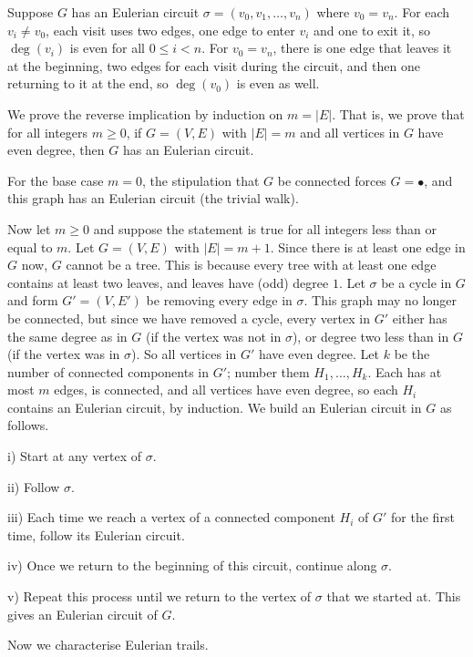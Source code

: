 \proof Suppose $G$ has an Eulerian circuit $\sigma = (v_0, v_1, \ldots, v_n)$ where
$v_0 = v_n$. For each $v_i\ne v_0$, each visit uses two edges, one edge to enter $v_i$ and
one to exit it, so $\deg(v_i)$ is even for all $0\le i < n$. For $v_0 = v_n$, there is one
edge that leaves it at the beginning, two edges for each visit during the circuit, and then
one returning to it at the end, so $\deg(v_0)$ is even as well.

We prove the reverse implication by induction on $m = |E|$. That is, we prove
that for all integers $m\ge 0$, if $G = (V,E)$ with $|E| = m$ and all vertices in $G$ have
even degree, then $G$ has an Eulerian circuit.

For the base case $m=0$, the stipulation
that $G$ be connected forces
$G = \bullet$, and this graph has an Eulerian circuit (the trivial walk).

Now let $m\ge 0$ and suppose the statement is true for all integers less than or equal to $m$.
Let $G = (V,E)$ with $|E| = m+1$. Since there is at least one edge in $G$ now, $G$ cannot be
a tree. This is because every tree with at least one edge contains at least two leaves,
and leaves have (odd) degree $1$. Let $\sigma$ be a cycle in $G$ and form $G' = (V,E')$
be removing every edge in $\sigma$. This graph may no longer be connected, but since we have removed
a cycle, every vertex in $G'$ either has the same degree as in $G$ (if the vertex
was not in $\sigma$), or degree two less than in $G$ (if the vertex was in $\sigma$). So all
vertices in $G'$ have even degree. Let $k$ be the number of connected components in
$G'$; number them $H_1,\ldots,H_k$. Each has at most $m$ edges, is connected, and all vertices
have even degree, so each $H_i$ contains an Eulerian circuit, by induction. We build an Eulerian
circuit in $G$ as follows.
\medskip
\item{i)} Start at any vertex of $\sigma$.
\smallskip
\item{ii)} Follow $\sigma$.
\smallskip
\item{iii)} Each time we reach a vertex of a connected component $H_i$ of $G'$ for the first
time, follow its Eulerian circuit.
\smallskip
\item{iv)} Once we return to the beginning of this circuit, continue along $\sigma$.
\smallskip
\item{v)} Repeat this process until we return to the vertex of $\sigma$ that we started at.
\medskip
This gives an Eulerian circuit of $G$.\slug

Now we characterise Eulerian trails.

